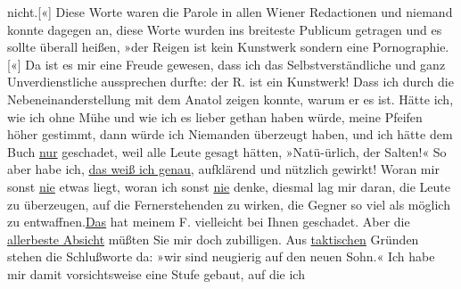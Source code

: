 \begin{ledgroupsized}[t]{13cm}
                  nicht.{[}«{]} Diese Worte waren die Parole in allen Wiener Redactionen und niemand konnte dagegen an,
               diese Worte wurden ins breiteste Publicum getragen und es sollte überall heißen, »der
                  Reigen ist kein Kunstwerk sondern eine
                  Pornographie.{[}«{]} Da ist es mir eine Freude gewesen, dass ich
               das Selbstverständliche und ganz Unverdienstliche aussprechen durfte: der R. ist ein Kunstwerk! Dass ich durch die
               Nebeneinanderstellung mit dem Anatol zeigen
               konnte, warum er es ist. Hätte ich, wie ich ohne Mühe und wie ich es lieber gethan
               haben würde, meine Pfeifen höher gestimmt, dann würde ich Niemanden überzeugt haben,
               und ich hätte dem Buch \uline{nur} geschadet, weil alle Leute
               gesagt hätten, »Natü-ürlich, der Salten!« So aber habe ich, \uline{das weiß ich genau}, aufklärend und nützlich gewirkt! Woran mir sonst
                  \uline{nie} etwas liegt, woran ich sonst \uline{nie} denke, diesmal lag mir daran, die Leute zu
               überzeugen, auf die Fernerstehenden zu wirken, die Gegner so viel als möglich zu
                  entwaffnen.\uline{Das} hat meinem F. vielleicht bei Ihnen geschadet. Aber die
                  \uline{allerbeste Absicht} müßten Sie mir doch zubilligen. \pend
           \pstart
           Aus \uline{taktischen} Gründen stehen die Schlußworte da:
                  »wir sind neugierig auf den
                  neuen Sohn.« Ich habe mir damit vorsichtsweise eine Stufe gebaut, auf die ich

\end{ledgroupsized}
